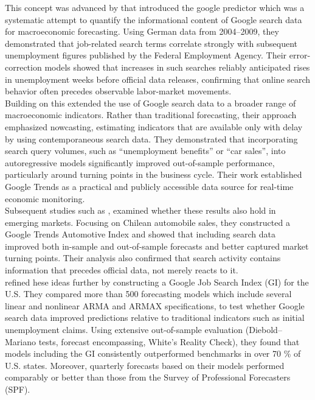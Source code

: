 \documentclass[12pt,a4paper]{article}
\begin{document}
This concept was advanced by \textcite{Askitas2009} that introduced the google predictor which was a systematic attempt to quantify the informational content of Google search data for macroeconomic forecasting.
Using German data from 2004–2009, they demonstrated that job-related search terms correlate strongly with subsequent unemployment figures published by the Federal Employment Agency.
Their error-correction models showed that increases in such searches reliably anticipated rises in unemployment weeks before official data releases, confirming that online search behavior often precedes observable labor-market movements.\\
Building on this \textcite{varian} extended the use of Google search data to a broader range of macroeconomic indicators.
Rather than traditional forecasting, their approach emphasized nowcasting, estimating indicators that are available only with delay by using contemporaneous search data.
They demonstrated that incorporating search query volumes, such as “unemployment benefits” or “car sales”, into autoregressive models significantly improved out-of-sample performance, particularly around turning points in the business cycle.
Their work established Google Trends as a practical and publicly accessible data source for real-time economic monitoring.\\
Subsequent studies such as \textcite{carrier}, examined whether these results also hold in emerging markets.
Focusing on Chilean automobile sales, they constructed a Google Trends Automotive Index and showed that including search data improved both in-sample and out-of-sample forecasts and better captured market turning points.
Their analysis also confirmed that search activity contains information that precedes official data, not merely reacts to it.
\\
\textcite{D'Amuri2010Google} refined hese ideas further by constructing a Google Job Search Index (GI) for the U.S.
They compared more than 500 forecasting models which include several linear and nonlinear ARMA and ARMAX specifications, to test whether Google search data improved predictions relative to traditional indicators such as initial unemployment claims.
Using extensive out-of-sample evaluation (Diebold–Mariano tests, forecast encompassing, White’s Reality Check), they found that models including the GI consistently outperformed benchmarks in over 70 \% of U.S. states.
Moreover, quarterly forecasts based on their models performed comparably or better than those from the Survey of Professional Forecasters (SPF).
\end{document}
